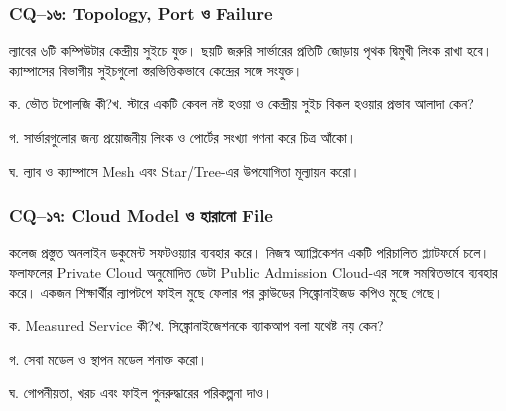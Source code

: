 \subsubsection{CQ–১৬: Topology, Port ও Failure}
ল্যাবের ৬টি কম্পিউটার কেন্দ্রীয় সুইচে যুক্ত। ছয়টি জরুরি সার্ভারের প্রতিটি জোড়ায় পৃথক দ্বিমুখী লিংক রাখা হবে। ক্যাম্পাসের বিভাগীয় সুইচগুলো স্তরভিত্তিকভাবে কেন্দ্রের সঙ্গে সংযুক্ত।
\begin{compactenum}
\item ক. ভৌত টপোলজি কী?\quad খ. স্টারে একটি কেবল নষ্ট হওয়া ও কেন্দ্রীয় সুইচ বিকল হওয়ার প্রভাব আলাদা কেন?
\item গ. সার্ভারগুলোর জন্য প্রয়োজনীয় লিংক ও পোর্টের সংখ্যা গণনা করে চিত্র আঁকো।
\item ঘ. ল্যাব ও ক্যাম্পাসে Mesh এবং Star/Tree-এর উপযোগিতা মূল্যায়ন করো।
\end{compactenum}

\subsubsection{CQ–১৭: Cloud Model ও হারানো File}
কলেজ প্রস্তুত অনলাইন ডকুমেন্ট সফটওয়্যার ব্যবহার করে। নিজস্ব অ্যাপ্লিকেশন একটি পরিচালিত প্ল্যাটফর্মে চলে। ফলাফলের Private Cloud অনুমোদিত ডেটা Public Admission Cloud-এর সঙ্গে সমন্বিতভাবে ব্যবহার করে। একজন শিক্ষার্থীর ল্যাপটপে ফাইল মুছে ফেলার পর ক্লাউডের সিঙ্ক্রোনাইজড কপিও মুছে গেছে।
\begin{compactenum}
\item ক. Measured Service কী?\quad খ. সিঙ্ক্রোনাইজেশনকে ব্যাকআপ বলা যথেষ্ট নয় কেন?
\item গ. সেবা মডেল ও স্থাপন মডেল শনাক্ত করো।
\item ঘ. গোপনীয়তা, খরচ এবং ফাইল পুনরুদ্ধারের পরিকল্পনা দাও।
\end{compactenum}
